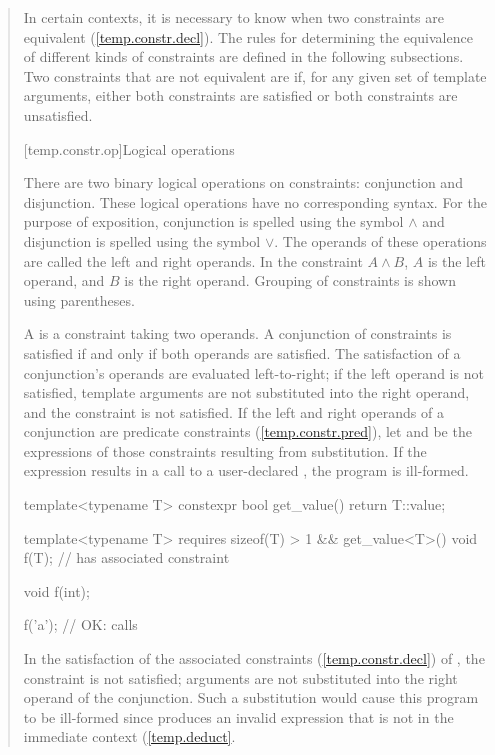 \begin{quote}
\pnum 
In certain contexts, it is necessary to know when two constraints are equivalent
(\ref{temp.constr.decl}). 
% 
The rules for determining the equivalence of different kinds of
constraints are defined in the following subsections.
% 
Two constraints that are not equivalent are  if,
for any given set of template arguments, either both constraints are satisfied
or both constraints are unsatisfied.


[temp.constr.op]{Logical operations}

\pnum
There are two binary logical operations on constraints: conjunction
and disjunction.
% 
\enternote 
These logical operations have no corresponding \Cpp syntax.
For the purpose of exposition, conjunction is spelled
using the symbol $\land$ and disjunction is spelled using the 
symbol $\lor$. 
% 
The operands of these operations are called the left 
and right operands. In the constraint $A \land B$,
$A$ is the left operand, and $B$ is the right operand.
% 
Grouping of constraints is shown using parentheses.
\exitnote

\pnum
A  is a constraint taking two 
operands. A conjunction of constraints is satisfied if and only 
if both operands are satisfied. 
% 
The satisfaction of a conjunction's operands are evaluated left-to-right; 
if the left operand is not satisfied, template arguments are not 
substituted into the right operand, and the constraint is not satisfied.
% 
If the left and right operands of a conjunction are predicate constraints
(\ref{temp.constr.pred}), let  and  be the expressions
of those constraints resulting from substitution. If the expression
 results in a call to a user-declared ,
the program is ill-formed.
% 
\enterexample
\begin{codeblock}
template<typename T>
  constexpr bool get_value() { return T::value; }

template<typename T>
  requires sizeof(T) > 1 && get_value<T>()
    void f(T);   // has associated constraint 

void f(int);

f('a'); // OK: calls 
\end{codeblock}
In the satisfaction of the associated constraints (\ref{temp.constr.decl}) 
of , the constraint  is not satisfied; 
arguments are not substituted into the right operand of the conjunction.
% 
Such a substitution would cause this program to be ill-formed since 
 produces an invalid expression that is not in
the immediate context (\ref{temp.deduct}.
\exitexample


\end{quote}
